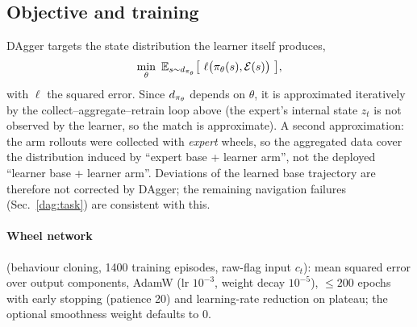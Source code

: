 \subsection{Objective and training}
\label{dag:train}

DAgger targets the state distribution the learner itself produces,
\begin{equation}
  \min_{\theta}\ \mathbb{E}_{s\sim d_{\pi_\theta}}\bigl[\ \ell\bigl(\pi_\theta(s),\mathcal{E}(s)\bigr)\ \bigr],
  \label{dag:obj}
\end{equation}
with $\ell$ the squared error. Since $d_{\pi_\theta}$ depends on $\theta$, it is approximated iteratively by the collect--aggregate--retrain loop above (the expert's internal state $z_t$ is not observed by the learner, so the match is approximate). A second approximation: the arm rollouts were collected with \emph{expert} wheels, so the aggregated data cover the distribution induced by ``expert base + learner arm'', not the deployed ``learner base + learner arm''. Deviations of the learned base trajectory are therefore not corrected by DAgger; the remaining navigation failures (Sec.~\ref{dag:task}) are consistent with this.

\paragraph{Wheel network} (behaviour cloning, 1400 training episodes, raw-flag input $c_t$): mean squared error over output components, AdamW (lr $10^{-3}$, weight decay $10^{-5}$), $\le200$ epochs with early stopping (patience 20) and learning-rate reduction on plateau; the optional smoothness weight defaults to $0$.

